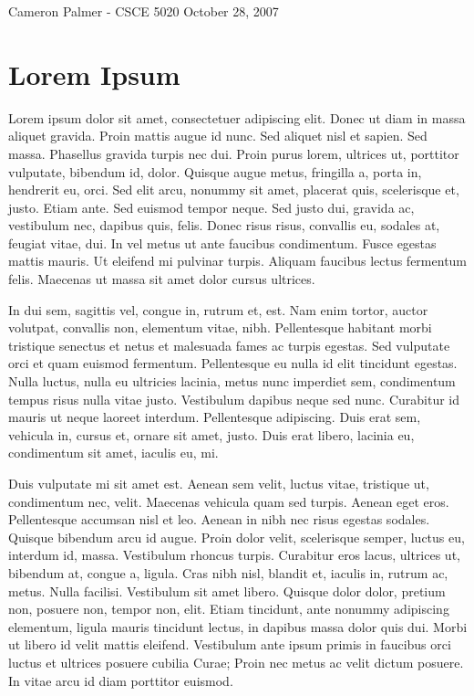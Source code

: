 \documentclass[12pt,twoside,letterpaper]{article}
\begin{document}
Cameron Palmer - CSCE 5020
October 28, 2007

\section*{Lorem Ipsum}

Lorem ipsum dolor sit amet, consectetuer adipiscing elit. Donec ut diam in massa aliquet gravida. Proin mattis augue id nunc. Sed aliquet nisl et sapien. Sed massa. Phasellus gravida turpis nec dui. Proin purus lorem, ultrices ut, porttitor vulputate, bibendum id, dolor. Quisque augue metus, fringilla a, porta in, hendrerit eu, orci. Sed elit arcu, nonummy sit amet, placerat quis, scelerisque et, justo. Etiam ante. Sed euismod tempor neque. Sed justo dui, gravida ac, vestibulum nec, dapibus quis, felis. Donec risus risus, convallis eu, sodales at, feugiat vitae, dui. In vel metus ut ante faucibus condimentum. Fusce egestas mattis mauris. Ut eleifend mi pulvinar turpis. Aliquam faucibus lectus fermentum felis. Maecenas ut massa sit amet dolor cursus ultrices.

In dui sem, sagittis vel, congue in, rutrum et, est. Nam enim tortor, auctor volutpat, convallis non, elementum vitae, nibh. Pellentesque habitant morbi tristique senectus et netus et malesuada fames ac turpis egestas. Sed vulputate orci et quam euismod fermentum. Pellentesque eu nulla id elit tincidunt egestas. Nulla luctus, nulla eu ultricies lacinia, metus nunc imperdiet sem, condimentum tempus risus nulla vitae justo. Vestibulum dapibus neque sed nunc. Curabitur id mauris ut neque laoreet interdum. Pellentesque adipiscing. Duis erat sem, vehicula in, cursus et, ornare sit amet, justo. Duis erat libero, lacinia eu, condimentum sit amet, iaculis eu, mi.

Duis vulputate mi sit amet est. Aenean sem velit, luctus vitae, tristique ut, condimentum nec, velit. Maecenas vehicula quam sed turpis. Aenean eget eros. Pellentesque accumsan nisl et leo. Aenean in nibh nec risus egestas sodales. Quisque bibendum arcu id augue. Proin dolor velit, scelerisque semper, luctus eu, interdum id, massa. Vestibulum rhoncus turpis. Curabitur eros lacus, ultrices ut, bibendum at, congue a, ligula. Cras nibh nisl, blandit et, iaculis in, rutrum ac, metus. Nulla facilisi. Vestibulum sit amet libero. Quisque dolor dolor, pretium non, posuere non, tempor non, elit. Etiam tincidunt, ante nonummy adipiscing elementum, ligula mauris tincidunt lectus, in dapibus massa dolor quis dui. Morbi ut libero id velit mattis eleifend. Vestibulum ante ipsum primis in faucibus orci luctus et ultrices posuere cubilia Curae; Proin nec metus ac velit dictum posuere. In vitae arcu id diam porttitor euismod.
\end{document}
